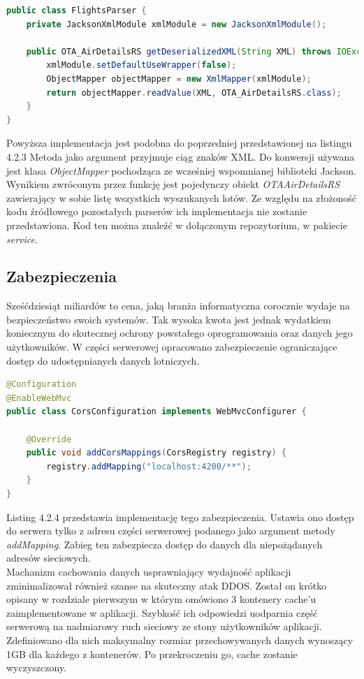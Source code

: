 \documentclass[12pt, twoside]{report}
\begin{document}
\begin{lstlisting}[language=java, caption=Implementacja parsowania treści XML]
public class FlightsParser {
    private JacksonXmlModule xmlModule = new JacksonXmlModule();

    public OTA_AirDetailsRS getDeserializedXML(String XML) throws IOException {
        xmlModule.setDefaultUseWrapper(false);
        ObjectMapper objectMapper = new XmlMapper(xmlModule);
        return objectMapper.readValue(XML, OTA_AirDetailsRS.class);
    }
}

\end{lstlisting}
Powyższa implementacja jest podobna do poprzedniej przedstawionej na listingu 4.2.3 Metoda jako argument przyjmuje ciąg znaków XML. Do konwersji używana jest klasa \textit{ObjectMapper} pochodząca ze wcześniej wspomnianej biblioteki Jackson. Wynikiem zwróconym przez funkcję jest pojedynczy obiekt \textit{OTAAirDetailsRS} zawierający w sobie listę wszystkich wyszukanych lotów.
Ze względu na złożoność kodu źródłowego pozostałych parserów ich implementacja nie zostanie przedstawiona. Kod ten można znaleźć w dołączonym repozytorium, w pakiecie \textit{service}.

\subsection{Zabezpieczenia}
Sześćdziesiąt miliardów to cena, jaką branża informatyczna corocznie wydaje na bezpieczeństwo swoich systemów. Tak wysoka kwota jest jednak wydatkiem koniecznym do skutecznej ochrony powstałego oprogramowania oraz danych jego użytkowników\cite{security}. W części serwerowej opracowano zabezpieczenie ograniczające dostęp do udostępnianych danych lotniczych.

\begin{lstlisting}[language=java, caption=Implementacja zabezpieczanie dostępu do serwera]
@Configuration
@EnableWebMvc
public class CorsConfiguration implements WebMvcConfigurer {

    @Override
    public void addCorsMappings(CorsRegistry registry) {
        registry.addMapping("localhost:4200/**");
    }
}
\end{lstlisting}
Listing 4.2.4 przedstawia implementację tego zabezpieczenia. Ustawia ono dostęp do serwera tylko z adresu części serwerowej podanego jako argument metody \textit{addMapping}. Zabieg ten zabezpiecza dostęp do danych dla niepożądanych adresów sieciowych. \\ \indent
Machanizm cachowania danych usprawniający wydajność aplikacji zminimalizował również szanse na skuteczny atak DDOS. Został on krótko opisany w rozdziale pierwszym w którym omówiono 3 kontenery cache'u zaimplementowane w aplikacji. Szybkość ich odpowiedzi uodparnia część serwerową na nadmiarowy ruch sieciowy ze stony użytkowników aplikacji. Zdefiniowano dla nich maksymalny rozmiar przechowywanych danych wynoszący 1GB dla każdego z kontenerów. Po przekroczeniu go, cache zostanie wyczyszczony.
\end{document}
